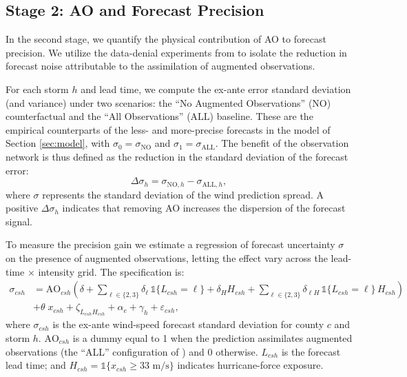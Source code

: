 \documentclass[12pt]{article}%
\begin{document}
\subsection{Stage 2: AO and Forecast Precision}

In the second stage, we quantify the physical contribution of AO to forecast precision. We utilize the data-denial experiments from \citet{DitchekEA2023} to isolate the reduction in forecast noise attributable to the assimilation of augmented observations.

For each storm $h$ and lead time, we compute the ex-ante error standard deviation (and variance) under two scenarios: the ``No Augmented Observations'' ($\text{NO}$) counterfactual and the ``All Observations'' ($\text{ALL}$) baseline. These are the empirical counterparts of the less- and more-precise forecasts in the model of Section \ref{sec:model}, with $\sigma_{0}=\sigma_{\text{NO}}$ and $\sigma_{1}=\sigma_{\text{ALL}}$. The benefit of the observation network is thus defined as the reduction in the standard deviation of the forecast error:
\begin{equation}
    \Delta \sigma_{h} = \sigma_{\text{NO}, h} - \sigma_{\text{ALL}, h},
\end{equation}
\noindent where $\sigma$ represents the standard deviation of the wind prediction spread. A positive $\Delta \sigma_{h}$ indicates that removing AO increases the dispersion of the forecast signal.

To measure the precision gain we estimate a regression of forecast uncertainty $\sigma$ on the presence of augmented observations, letting the effect vary across the lead-time $\times$ intensity grid. The specification is:
\begin{align}\label{eq:stage2_reg}
   \sigma_{csh}
   &= \text{AO}_{csh}\!\left(\delta + \sum_{\ell\in\{2,3\}}\delta_\ell\,\mathbb{1}\{L_{csh}=\ell\} + \delta_H H_{csh} + \sum_{\ell\in\{2,3\}}\delta_{\ell H}\,\mathbb{1}\{L_{csh}=\ell\}\,H_{csh}\right) \nonumber\\
   &+ \theta \;x_{csh} + \zeta_{L_{csh}H_{csh}} + \alpha_c + \gamma_h + \varepsilon_{csh},
\end{align}
where $\sigma_{csh}$ is the ex-ante wind-speed forecast standard deviation for county $c$ and storm $h$. $\text{AO}_{csh}$ is a dummy equal to 1 when the prediction assimilates augmented observations (the ``ALL'' configuration of \citet{DitchekEA2023}) and 0 otherwise. $L_{csh}$ is the forecast lead time; and $H_{csh}=\mathbb{1}\{x_{csh}\ge 33\text{ m/s}\}$ indicates hurricane-force exposure.
\end{document}
